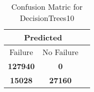 \begin{table}[] 
\caption{Confusion Matric for DecisionTrees10} 
\label{Table: Prediction Accuracy-DMDDecisionTrees10OnlySunEKF-resetReflectionperfectNoFailurePrediction-Reflection} 
\centering 
\begin{tabular} 
 {@{}ccc@{}} 
\toprule 
\multicolumn{2}{c}{\textbf{Predicted}}
 \\ \midrule 
\multicolumn{1}{|c|}{Failure} & 
\multicolumn{1}{c|}{No Failure}
 \\ \midrule 
\multicolumn{1}{|c|}{\color{green}\textbf{127940}} & 
\multicolumn{1}{c|}{\color{red}\textbf{0}}
 \\ \midrule 
\multicolumn{1}{|c|}{\color{red}\textbf{15028}} & 
\multicolumn{1}{c|}{\color{green}\textbf{27160}}
 \\ \bottomrule 
\end{tabular} 
\end{table} 
